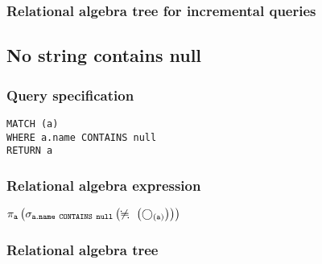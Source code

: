 \subsubsection*{Relational algebra tree for incremental queries}


\subsection{No string contains null}

\subsubsection*{Query specification}

\begin{lstlisting}
MATCH (a)
WHERE a.name CONTAINS null
RETURN a
\end{lstlisting}

\subsubsection*{Relational algebra expression}

$\projection{\var{a}} \left(\selection{\mathtt{a.name~CONTAINS~null}} \left(\alldifferent{} \left(\getvertices{a}{}\right)\right)\right)$

\subsubsection*{Relational algebra tree}


